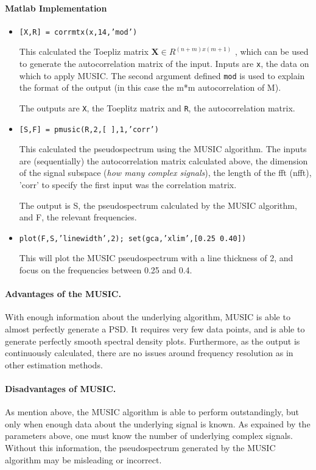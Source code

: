 \documentclass[main.tex]{subfiles}
\begin{document}
\paragraph{Matlab Implementation}

\begin{itemize}
	\item {\tt [X,R] = corrmtx(x,14,'mod')}
	
	This calculated the Toepliz matrix $\textbf{X} \in R^{(n+m)x(m+1)}$ , which can be used to generate the autocorrelation matrix of the input. Inputs are {\tt x}, the data on which to apply MUSIC. The second argument defined {\tt mod} is used to explain the format of the output (in this case the m*m autocorrelation of M).
	
	The outputs are {\tt X}, the Toeplitz matrix and {\tt R}, the autocorrelation matrix.
	\item {\tt [S,F] = pmusic(R,2,[ ],1,'corr')}
	
	This calculated the pseudospectrum using the MUSIC algorithm. The inputs are (sequentially) the autocorrelation matrix calculated above, the dimension of the signal subspace (\textit{how many complex signals}), the length of the fft (nfft), 'corr' to specify the first input was the correlation matrix.
	
	The output is S, the pseudospectrum calculated by the MUSIC algorithm, and F, the relevant frequencies.
	\item {\tt plot(F,S,'linewidth',2); set(gca,'xlim',[0.25 0.40]) }
	
	This will plot the MUSIC pseudospectrum with a line thickness of 2, and focus on the frequencies between 0.25 and 0.4.
\end{itemize}

\paragraph{Advantages of the MUSIC.}

With enough information about the underlying algorithm, MUSIC is able to almost perfectly generate a PSD. It requires very few data points, and is able to generate perfectly smooth spectral density plots. Furthermore, as the output is continuously calculated, there are no issues around frequency resolution as in other estimation methods.

\paragraph{Disadvantages of MUSIC.} As mention above, the MUSIC algorithm is able to perform outstandingly, but only when enough data about the underlying signal is known. As expained by the parameters above, one must know the number of underlying complex signals. Without this information, the pseudospectrum generated by the MUSIC algorithm may be misleading or incorrect.
\end{document}
